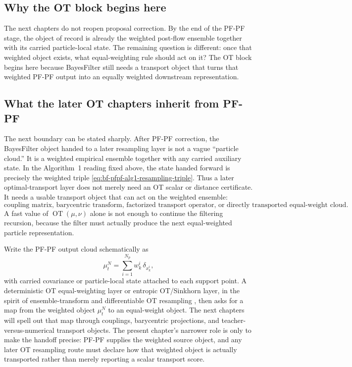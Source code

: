 \subsection{Why the OT block begins here}
\label{sec:bf-pfpf-ot-why-here}

The next chapters do not reopen proposal correction.  By the end of the PF-PF
stage, the object of record is already the weighted post-flow ensemble together
with its carried particle-local state.  The remaining question is different: once
that weighted object exists, what equal-weighting rule should act on it?  The OT
block begins here because BayesFilter still needs a transport object that turns
that weighted PF-PF output into an equally weighted downstream representation.

\subsection{What the later OT chapters inherit from PF-PF}
\label{sec:bf-pfpf-ot-handoff}

The next boundary can be stated sharply.  After
PF-PF correction, the BayesFilter object handed to a later resampling layer is
not a vague ``particle cloud.''  It is a weighted empirical ensemble together
with any carried auxiliary state.  In the Algorithm~1 reading fixed above, the
state handed forward is precisely the weighted triple
\eqref{eq:bf-pfpf-alg1-resampling-triple}.  Thus a later optimal-transport
layer does not merely need an OT scalar or distance certificate.  It needs a
usable transport object that can act on the weighted ensemble:
\begin{equation}
\label{eq:bf-pfpf-transport-object-inventory}
  \text{coupling matrix, barycentric transform, factorized transport operator,}
  \text{ or directly transported equal-weight cloud.}
\end{equation}
A fast value of \(\operatorname{OT}(\mu,\nu)\) alone is not enough to continue the filtering
recursion, because the filter must actually produce the next equal-weighted
particle representation.

Write the PF-PF output cloud schematically as
\begin{equation}
\label{eq:bf-pfpf-weighted-output-cloud}
  \mu_t^N
  =
  \sum_{i=1}^{N_p} w_k^i\,\delta_{x_k^i},
\end{equation}
with carried covariance or particle-local state attached to each support point.
A deterministic OT equal-weighting layer or entropic OT/Sinkhorn layer, in the
spirit of ensemble-transform and differentiable OT resampling
\citep{reich2013nonparametric,corenflos2021differentiable}, then asks for a
map from the weighted object \(\mu_t^N\) to an equal-weight object.  The next
chapters will spell out that map through couplings, barycentric projections, and
teacher-versus-numerical transport objects.  The present chapter's narrower role
is only to make the handoff precise: PF-PF supplies the weighted source object,
and any later OT resampling route must declare how that weighted object is
actually transported rather than merely reporting a scalar transport score.

